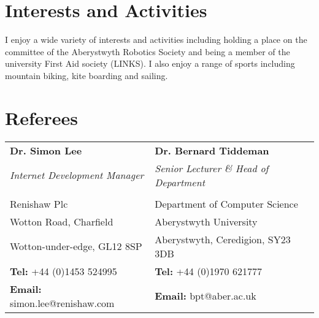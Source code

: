 \documentclass[a4paper, 10pt]{extarticle} %
\begin{document}

\section{Interests and Activities}

{\small I enjoy a wide variety of interests and activities including holding a place on the committee of the Aberystwyth Robotics Society and being a member of the university First Aid society (LINKS). I also enjoy a range of sports including mountain biking, kite boarding and sailing.}

\section{Referees}

\begin{small}
\begin{tabularx}{\textwidth}{X X}

\textbf{Dr. Simon Lee} & \textbf{Dr. Bernard Tiddeman} \\
\textit{Internet Development Manager} & \textit{Senior Lecturer \& Head of Department} \\\\ 

Renishaw Plc & Department of Computer Science \\ 
Wotton Road, Charfield & Aberystwyth University \\ 
Wotton-under-edge, GL12 8SP & Aberystwyth, Ceredigion, SY23 3DB  \\
\textbf{Tel:} +44 (0)1453 524995 & \textbf{Tel:}  +44 (0)1970 621777 \\
\textbf{Email:} simon.lee@renishaw.com & \textbf{Email:} bpt@aber.ac.uk

\end{tabularx}

\end{small}


\end{document}
